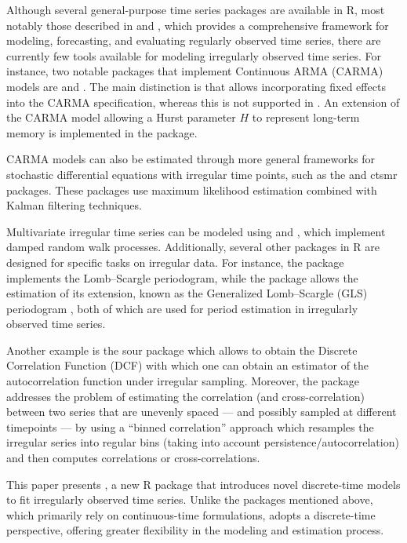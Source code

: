 Although several general-purpose time series packages are available in R, most notably those described in \citet{HyndmanAthanasopoulosBergmeirCaceresChhayOHaraWildPetropoulosRazbashWangYasmeen2026} and \citet{HyndmanKhandakar2008}, which provides a comprehensive framework for modeling, forecasting, and evaluating regularly observed time series, there are currently few tools available for modeling irregularly observed time series. For instance, two notable packages that implement Continuous ARMA (CARMA) models are  and  \citep{Yuima_2014}. The main distinction is that  allows incorporating fixed effects into the CARMA specification, whereas this is not supported in . An extension of the CARMA model allowing a Hurst parameter \(H\) to represent long-term memory is implemented in the  package.

CARMA models can also be estimated through more general frameworks for stochastic differential equations with irregular time points, such as the  \citep{sde_2008} and ctsmr \citep{ctsmr_2016} packages. These packages use maximum likelihood estimation combined with Kalman filtering techniques.

Multivariate irregular time series can be modeled using  and , which implement damped random walk processes. Additionally, several other packages in R are designed for specific tasks on irregular data.
For instance, the  package \citep{Lomb} implements the Lomb--Scargle periodogram, while the  package \citep{RobPer} allows the estimation of its extension, known as the Generalized Lomb--Scargle (GLS) periodogram \citep{GLS}, both of which are used for period estimation in irregularly observed time series.

Another example is the sour package \citep{sour} which allows to obtain the Discrete Correlation Function (DCF) with which one can obtain an estimator of the autocorrelation function under irregular sampling. Moreover, the package  \citep{PolancoMedinaMartinGoniMudelsee2019} addresses the problem of estimating the correlation (and cross-correlation) between two series that are unevenly spaced --- and possibly sampled at different timepoints --- by using a ``binned correlation'' approach which resamples the irregular series into regular bins (taking into account persistence/autocorrelation) and then computes correlations or cross-correlations.

This paper presents , a new R package that introduces novel discrete-time models to fit irregularly observed time series. Unlike the packages mentioned above, which primarily rely on continuous-time formulations,  adopts a discrete-time perspective, offering greater flexibility in the modeling and estimation process.

